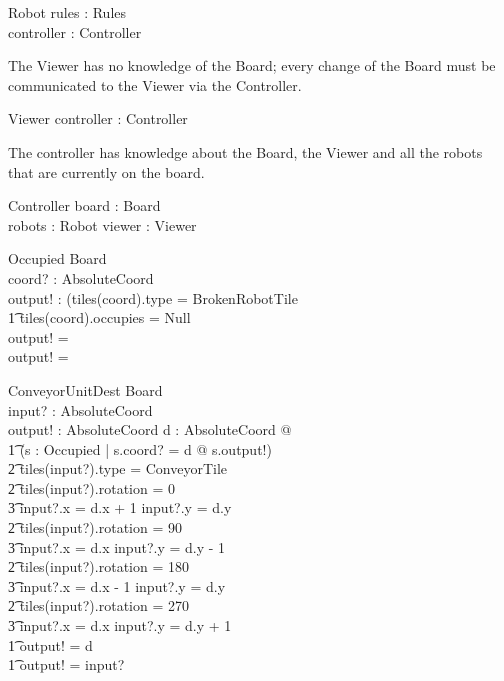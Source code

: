 \documentclass[12pt]{article}
\begin{document}
\begin{schema}{Robot}
rules : Rules \\
controller : Controller
\end{schema}

The Viewer has no knowledge of the Board; every change of the Board must be communicated to the Viewer via the Controller.

\begin{schema}{Viewer}
controller : Controller
\end{schema}

The controller has knowledge about the Board, the Viewer and all the robots that are currently on the board.

\begin{schema}{Controller}
board : Board \\
robots : \power Robot
viewer : Viewer
\end{schema}

\begin{schema}{Occupied}
\Xi Board \\
coord? : AbsoluteCoord \\
output! : \bool
\where
\IF (tiles(coord).type = BrokenRobotTile \; \; \vee \\ \t1
tiles(coord).occupies \not = Null \\
\THEN
output! = \true \\
\ELSE
output! = \false
\end{schema}

\begin{schema}{ConveyorUnitDest}
\Xi Board \\
input? : AbsoluteCoord \\
output! : AbsoluteCoord
\where
\IF \exists d : AbsoluteCoord @ \\ \t1
    (\exists s : Occupied | s.coord? = d @ \neg s.output!) \; \; \wedge \\ \t2
        tiles(input?).type = ConveyorTile \\ \t2
        tiles(input?).rotation = 0 \Rightarrow \\ \t3 input?.x = d.x + 1 \wedge input?.y = d.y \\ \t2
        tiles(input?).rotation = 90 \Rightarrow \\ \t3 input?.x = d.x \wedge input?.y = d.y - 1 \\ \t2
        tiles(input?).rotation = 180 \Rightarrow \\ \t3 input?.x = d.x - 1 \wedge input?.y = d.y \\ \t2
        tiles(input?).rotation = 270 \Rightarrow \\ \t3 input?.x = d.x \wedge input?.y = d.y + 1 \\ \t1
    \THEN output! = d \\ \t1
    \ELSE output! = input?
\end{schema}
\end{document}
